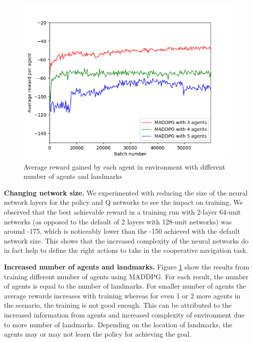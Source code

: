 \documentclass{article}
\begin{document}
\begin{figure}
\begin{center}
\includegraphics[scale=0.5]{maddpg_3,4,5agents.png}
\end{center}
\caption{Average reward gained by each agent in environment with different number of agents and landmarks}
\label{fig:avg_reward_multiple_agents}
\end{figure}

\textbf{Changing network size.} We experimented with reducing the size of the neural network layers for the policy and Q networks to see the impact on training. We observed that the best achievable reward in a training run with 2-layer 64-unit networks (as opposed to the default of 2 layers with 128-unit networks) was around -175, which is noticeably lower than the -150 achieved with the default network size. This shows that the increased complexity of the neural networks do in fact help to define the right actions to take in the cooperative navigation task. 

\textbf{Increased number of agents and landmarks.} Figure \ref{fig:avg_reward_multiple_agents} show the results from training different number of agents using MADDPG. For each result, the number of agents is equal to the number of landmarks. For smaller number of agents the average rewards increases with training whereas for even 1 or 2 more agents in the scenario, the training is not good enough. This can be attributed to the increased information from agents and increased complexity of environment due to more number of landmarks. Depending on the location of landmarks, the agents may or may not learn the policy for achieving the goal.   
\end{document}
